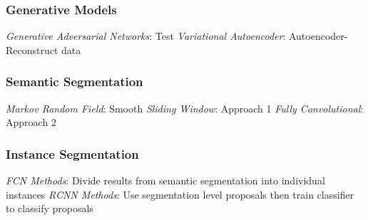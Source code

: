 \documentclass{article}
\begin{document}
\begin{multicols*}{2}
        \subsubsection*{Generative Models}
        \textit{Generative Adversarial Networks}: Test\newline
        \textit{Variational Autoencoder}: Autoencoder- Reconstruct data\newline
        \subsubsection*{Semantic Segmentation}
        \textit{Markov Random Field}: Smooth\newline
        \textit{Sliding Window}: Approach 1\newline
        \textit{Fully Convolutional}: Approach 2\newline
        \subsubsection*{Instance Segmentation}
        \textit{FCN Methods}: Divide results from semantic segmentation into individual instances\newline
        \textit{RCNN Methods}: Use segmentation level proposals then train classifier to classify
        proposals\newline
    \end{multicols*}
\end{document}

